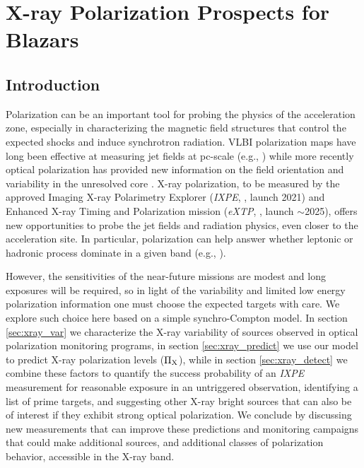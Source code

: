 \chapter{X-ray Polarization Prospects for Blazars}
\label{chap:prospects}

\section{Introduction}

Polarization can be an important tool for probing the physics of the acceleration zone, especially in characterizing the magnetic field structures that control the expected shocks and induce synchrotron radiation. VLBI polarization maps have long been effective at measuring jet fields at pc-scale (e.g., \citealp{hovatta_mojave_2012}) while more recently optical polarization has provided new information on the field orientation and variability in the unresolved core \citep{blinov_robopol:_2018}. X-ray polarization, to be measured by the approved  Imaging X-ray Polarimetry Explorer ({\it IXPE}, \citealp{weisskopf_overview_2018}, launch 2021) and Enhanced X-ray Timing and Polarization mission ({\it eXTP}, \citealp{zhang_extp_2017}, launch $\sim$2025), offers new opportunities to probe the jet fields and radiation physics, even closer to the acceleration site. In particular, polarization can help answer whether leptonic or hadronic process dominate in a given band (e.g., \citealp{zhang_polarization_2016}).

However, the sensitivities of the near-future missions are modest and long exposures will
be required, so in light of the variability and limited low energy polarization information one
must choose the expected targets with care. We explore such choice here based on a simple synchro-Compton model. In section \ref{sec:xray_var} we characterize the X-ray variability of sources observed in optical polarization monitoring programs, in section \ref{sec:xray_predict} we use our model to predict X-ray polarization levels ($\rm\Pi_X$), while in section \ref{sec:xray_detect} we combine these factors to quantify the success probability of an {\it IXPE} measurement for reasonable exposure in an untriggered observation, identifying a list of prime targets, and suggesting other X-ray bright sources that can also be of interest if they exhibit strong optical polarization. We conclude by discussing new measurements that can improve these predictions and monitoring campaigns that could make additional sources, and additional classes of polarization behavior, accessible in the X-ray band.

